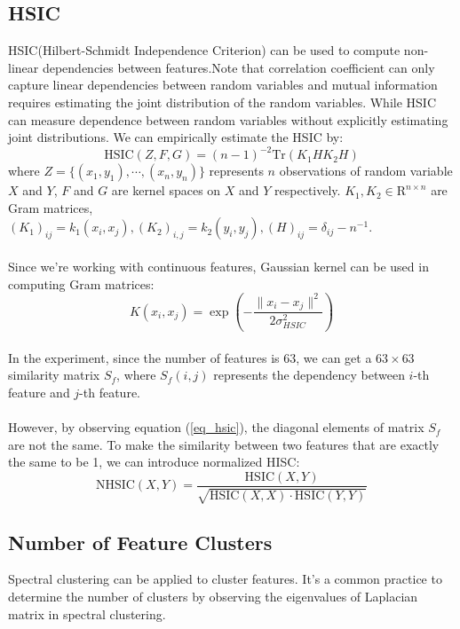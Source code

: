 \documentclass{article}
\newcommand{\HSIC}{\mathrm{HSIC}}
\newcommand{\NHSIC}{\mathrm{NHSIC}}
\newcommand{\Tr}{\mathrm{Tr}}
\begin{document}
\subsection{HSIC}
HSIC(Hilbert-Schmidt Independence Criterion) can be used to compute non-linear dependencies between features.Note that correlation coefficient can only capture linear dependencies between random variables and mutual information requires estimating the joint distribution of the random variables. While HSIC can measure dependence between random variables without explicitly estimating joint distributions. We can empirically estimate the HSIC by:\\
\begin{equation}
	\label{eq_hsic}
	\HSIC(Z,F,G)=(n-1)^{-2}\Tr(K_1HK_2H)
\end{equation}
where $Z = \{(x_1,y_1),\cdots,(x_n,y_n)\}$ represents $n$ observations of random variable $X$ and $Y$, $F$ and $G$ are kernel spaces on $X$ and $Y$ respectively. $K_1,K_2\in \mathrm{R}^{n\times n}$ are Gram matrices, $(K_1)_{ij}=k_1(x_i,x_j),(K_2)_{i,j}=k_2(y_i,y_j),(H)_{ij}=\delta_{ij}-n^{-1}$.\\ 
\\
Since we're working with continuous features, Gaussian kernel can be used in computing Gram matrices:\\
\begin{equation}
	K(x_i,x_j) = \exp(-\frac{\|x_i-x_j\|^2}{2\sigma_{HSIC}^2})
\end{equation} 
\\
In the experiment, since the number of features is 63, we can get a $63\times 63$ similarity matrix $S_f$, where $S_{f}(i,j)$ represents the dependency between $i$-th feature and $j$-th feature.\\
\\
However, by observing equation (\ref{eq_hsic}), the diagonal elements of matrix $S_f$ are not the same. To make the similarity between two features that are exactly the same to be 1, we can introduce normalized HISC:
\begin{equation}
	\NHSIC(X,Y) = \frac{\HSIC(X,Y)}{\sqrt{\HSIC(X,X)\cdot \HSIC(Y,Y)}}
\end{equation}  

\subsection{Number of Feature Clusters}
Spectral clustering can be applied to cluster features. It's a common practice to determine the number of clusters by observing the eigenvalues of Laplacian matrix in spectral clustering.
\end{document}
